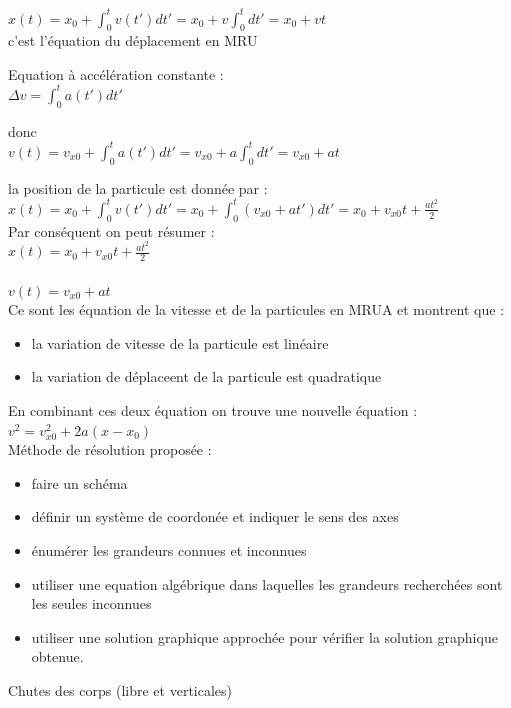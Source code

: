 \documentclass[]{article}
\begin{document}
\indent \indent $x(t)= x_0 + \displaystyle \int^t_0 v(t')dt' = x_0 + v\int^t_0 dt' = x_0 + vt$\\

c'est l'équation du déplacement en MRU

\newpage

Equation à accélération constante :\\

\indent \indent $\Delta v = \displaystyle \int^t_0 a(t')dt'$

donc\\

\indent \indent $v(t) = v_{x0} + \displaystyle \int^t_0 a(t')dt' = v_{x0} +a \int^t_0 dt' = v_{x0} + at$

la position de la particule est donnée par :\\

\indent \indent $x(t) = x_{0} + \displaystyle \int^t_0 v(t')dt' = x_0 + \int^t_0 (v_{x0}+at')dt' = x_0 + v_{x0}t + \frac{at^2}{2}$\\

Par conséquent on peut résumer :\\

\indent \indent $x(t) = x_0 + v_{x0}t + \frac{at^2}{2}$\\\\
\indent \indent $v(t) = v_{x0} + at$\\

Ce sont les équation de la vitesse et de la particules en MRUA et montrent que :

\begin{itemize}
  \item la variation de vitesse de la particule est linéaire 
  \item la variation de déplaceent de la particule est quadratique
\end{itemize}

En combinant ces deux équation on trouve une nouvelle équation :\\

\indent \indent $v^2 = v^2_{x0}+2a(x-x_0)$\\

Méthode de résolution proposée :\\
\begin{itemize}
\item faire un schéma
\item définir un système de coordonée et indiquer le sens des axes
\item énumérer les grandeurs connues et inconnues
\item utiliser une equation algébrique dans laquelles les grandeurs recherchées sont les seules inconnues
  \item utiliser une solution graphique approchée pour vérifier la solution graphique obtenue.
\end{itemize}
\newpage
Chutes des corps (libre et verticales)\\\\
\end{document}
